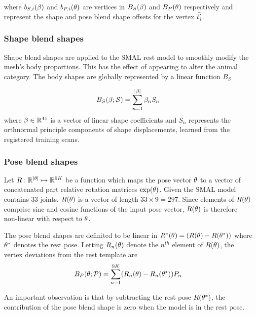where $b_{S,i}(\beta)$ and $b_{P, i}(\theta)$ are vertices in $B_{S}(\beta)$ and $B_{P}(\theta)$ respectively and represent the shape and pose blend shape offsets for the vertex $\bar{t'_{i}}$.

\subsubsection{Shape blend shapes}

Shape blend shapes are applied to the SMAL rest model to smoothly modify the mesh's body proportions. This has the effect of appearing to alter the animal category. The body shapes are globally represented by a linear function $B_{S}$

\begin{equation}\label{eqt:shapeblendshapes}
    B_{S}(\beta;\mathcal{S}) = \sum_{n=1}^{|\beta|}\beta_{n}S_{n}
\end{equation}
where $\beta \in {\mathbb{R}^{41}}$ is a vector of linear shape coefficients and $S_{n}$ represents the orthnormal principle components of shape displacements, learned from the registered training scans. 


\subsubsection{Pose blend shapes}

Let $R: {\mathbb{R}^{|\theta|}} \mapsto {\mathbb{R}^{9K}}$ be a function which maps the pose vector $\theta$ to a vector of concatenated part relative rotation matrices $\exp(\theta)$. Given the SMAL model contains $33$ joints, $R(\theta)$ is a vector of length $33 \times 9 = 297$. Since elements of $R(\theta)$ comprise sine and cosine functions of the input pose vector, $R(\theta)$ is therefore non-linear with respect to $\theta$.

The pose blend shapes are definited to be linear in $R^{*}(\theta) = (R(\theta) - R(\theta^{*}))$ where $\theta^{*}$ denotes the rest pose. Letting $R_{n}(\theta)$ denote the $n^{th}$ element of $R(\theta)$, the vertex deviations from the rest template are
\begin{equation}
    B_{P}(\theta;\mathcal{P}) = \sum_{n=1}^{9K} (R_{n}(\theta) - R_{n}(\theta^{*}))P_{n}
\end{equation}

An important observation is that by subtracting the rest pose $R(\theta^{*})$, the contribution of the pose blend shape is zero when the model is in the rest pose.


